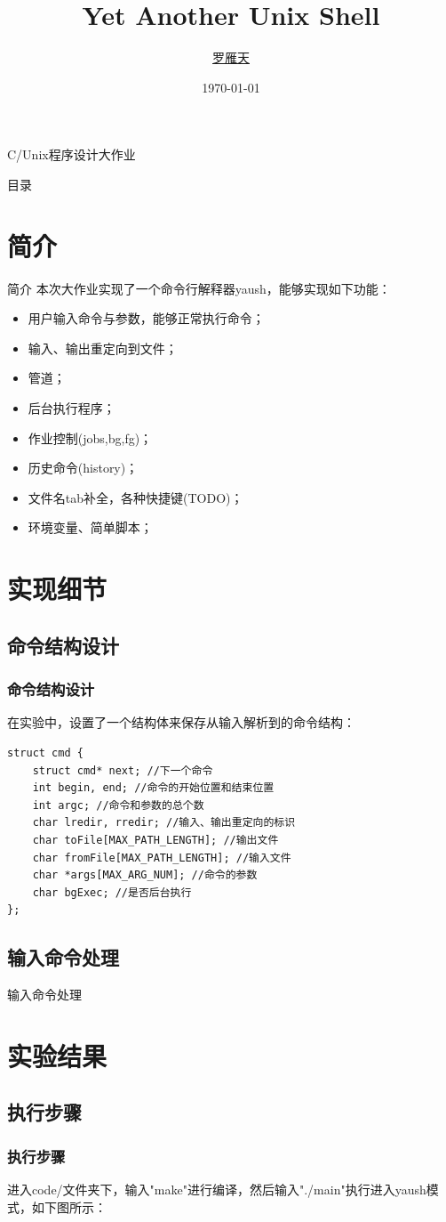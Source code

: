 \documentclass[10pt]{beamer}
\title{Yet Another Unix Shell }
\author{\href{mailto:luoyt14thu@gmail.com}{罗雁天}}
\date{\today}
\begin{document}
\begin{frame}{C/Unix程序设计大作业}
\titlepage
\end{frame}

\begin{frame}{目录}
\tableofcontents
\end{frame}

\section{简介}

\begin{frame}{简介}
本次大作业实现了一个命令行解释器yaush，能够实现如下功能：

\begin{itemize}
	\item 用户输入命令与参数，能够正常执行命令；
	\item 输入、输出重定向到文件；
	\item 管道；
	\item 后台执行程序；
	\item 作业控制(jobs,bg,fg)；
	\item 历史命令(history)；
	\item 文件名tab补全，各种快捷键(TODO)；
	\item 环境变量、简单脚本；
\end{itemize}
\end{frame}

\section{实现细节}
\subsection{命令结构设计}
\begin{frame}[fragile]
\frametitle{命令结构设计}
在实验中，设置了一个结构体来保存从输入解析到的命令结构：
\begin{lstlisting}
struct cmd {
    struct cmd* next; //下一个命令
    int begin, end; //命令的开始位置和结束位置
    int argc; //命令和参数的总个数
    char lredir, rredir; //输入、输出重定向的标识
    char toFile[MAX_PATH_LENGTH]; //输出文件
    char fromFile[MAX_PATH_LENGTH]; //输入文件
    char *args[MAX_ARG_NUM]; //命令的参数
    char bgExec; //是否后台执行
};
\end{lstlisting}
\end{frame}

\subsection{输入命令处理}
\begin{frame}{输入命令处理}

\end{frame}

\section{实验结果}
\subsection{执行步骤}
\begin{frame}[fragile]
\frametitle{执行步骤}
进入code/文件夹下，输入"make"进行编译，然后输入"./main"执行进入yaush模式，如下图所示：



\end{frame}
\end{document}
